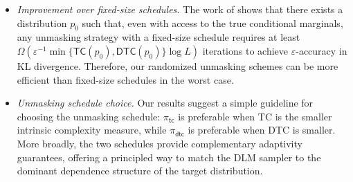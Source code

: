 \documentclass[english]{article}
\newcommand{\veps}{\varepsilon}
\newcommand{\TC}{\mathsf{TC}}
\newcommand{\DTC}{\mathsf{DTC}}
\newcommand{\tc}{\mathsf{tc}}
\newcommand{\dtc}{\mathsf{dtc}}
\begin{document}
\begin{itemize}
\item \textit{Improvement over fixed-size schedules.} The work of \citet{chen2025optimal} shows that there exists a distribution $p_0$ such that, even with access to the true conditional marginals, any unmasking strategy with a fixed-size schedule requires at least $\Omega(\veps^{-1}\min\{\TC(p_0),\DTC(p_0)\}\log L)$ iterations to achieve $\veps$-accuracy in KL divergence. 
Therefore, our randomized unmasking schemes can be more efficient than fixed-size schedules in the worst case.


\item \textit{Unmasking schedule choice.} Our results suggest a simple guideline for choosing the unmasking schedule:
 $\pi_\tc$ is preferable when TC is the smaller intrinsic complexity measure, while $\pi_\dtc$ is preferable when DTC is smaller. More broadly, the two schedules provide complementary adaptivity guarantees, offering a principled way to match the DLM sampler to the dominant dependence structure of the target distribution.

\end{itemize}
\end{document}
